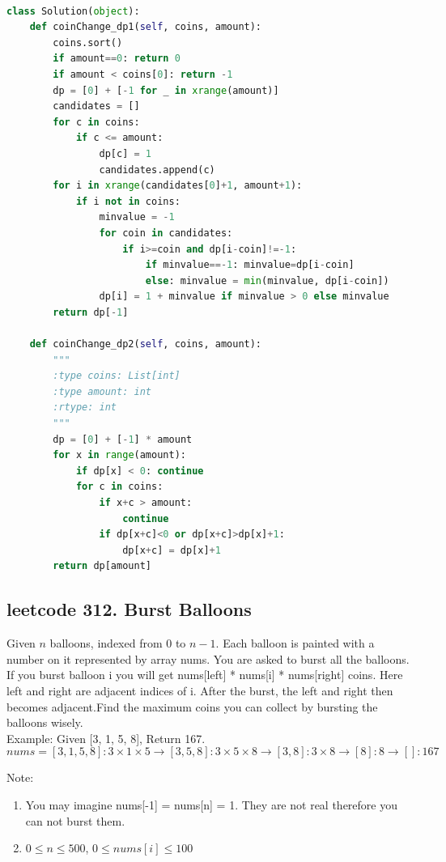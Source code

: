 \documentclass[a4paper,10pt]{article}
\begin{document}
\begin{lstlisting}[language=Python, caption=Problem322. Coin Change]

class Solution(object):
    def coinChange_dp1(self, coins, amount):
        coins.sort()
        if amount==0: return 0
        if amount < coins[0]: return -1
        dp = [0] + [-1 for _ in xrange(amount)]
        candidates = []
        for c in coins:
            if c <= amount:
                dp[c] = 1
                candidates.append(c)
        for i in xrange(candidates[0]+1, amount+1):
            if i not in coins:
                minvalue = -1
                for coin in candidates:
                    if i>=coin and dp[i-coin]!=-1:
                        if minvalue==-1: minvalue=dp[i-coin]
                        else: minvalue = min(minvalue, dp[i-coin])
                dp[i] = 1 + minvalue if minvalue > 0 else minvalue
        return dp[-1]
        
    def coinChange_dp2(self, coins, amount):
        """
        :type coins: List[int]
        :type amount: int
        :rtype: int
        """
        dp = [0] + [-1] * amount
        for x in range(amount):
            if dp[x] < 0: continue
            for c in coins:
                if x+c > amount:
                    continue
                if dp[x+c]<0 or dp[x+c]>dp[x]+1:
                    dp[x+c] = dp[x]+1
        return dp[amount]
\end{lstlisting}





\subsection{leetcode 312. Burst Balloons}
Given $n$ balloons, indexed from $0$ to $n-1$. Each balloon is painted with a number on it represented by array nums. You are asked to burst all the balloons. If you burst balloon i you will get nums[left] * nums[i] * nums[right] coins. Here left and right are adjacent indices of i. After the burst, the left and right then becomes adjacent.Find the maximum coins you can collect by bursting the balloons wisely.\\

\noindent Example: Given [3, 1, 5, 8], Return 167.
$$ nums = [3,1,5,8]: 3\times1\times5 \to [3,5,8]: 3\times5\times8 \to   [3,8]: 3\times8 \to [8]: 8 \to []: 167 $$

\noindent Note:
\begin{enumerate}
    \item You may imagine nums[-1] = nums[n] = 1. They are not real therefore you can not burst them.
    \item $0 \leq n \leq 500$, $0 \leq nums[i] \leq 100$ \\
\end{enumerate}
\end{document}
